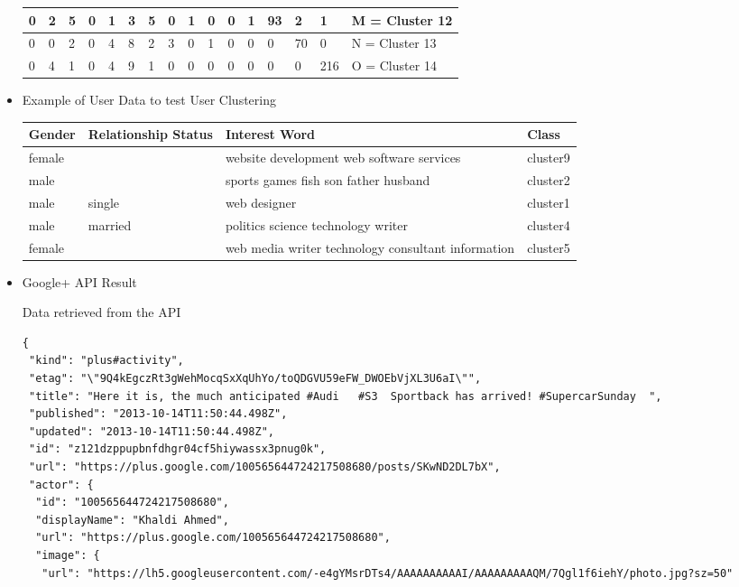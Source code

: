 \begin{itemize}
\begin{table}[H]
\begin{tabular}{|l|l|l|l|l|l|l|l|l|l|l|l|l|l|l|l|}
    0   & 2   & 5    & 0 & 1   & 3   & 5  & 0 & 1  & 0   & 0  & 1  & 93 & 2  & 1   & M = Cluster 12   \\ \hline
    0   & 0   & 2    & 0 & 4   & 8   & 2  & 3 & 0  & 1   & 0  & 0  & 0  & 70 & 0   & N = Cluster 13   \\ \hline
    0   & 4   & 1    & 0 & 4   & 9   & 1  & 0 & 0  & 0   & 0  & 0  & 0  & 0  & 216 & O = Cluster 14   \\ \hline
    \end{tabular}
\end{table}
\item Example of User Data to test User Clustering
\begin{table}[H]
    \begin{tabular}{|l|l|l|l|}
     \hline
    Gender & Relationship Status & Interest Word                                      & Class    \\  \hline
    female & ~                   & website development web  software services         & cluster9 \\  \hline
    male   & ~                   & sports games fish son father husband               & cluster2 \\  \hline
    male   & single              & web designer                                       & cluster1 \\  \hline
    male   & married             & politics science technology writer                 & cluster4 \\  \hline
    female & ~                   & web media writer technology consultant information & cluster5 \\  \hline
    \end{tabular}
\end{table}
\item Google+ API Result \\
{
Data retrieved from the API
\tiny
\begin{verbatim}
{
 "kind": "plus#activity",
 "etag": "\"9Q4kEgczRt3gWehMocqSxXqUhYo/toQDGVU59eFW_DWOEbVjXL3U6aI\"",
 "title": "Here it is, the much anticipated #Audi   #S3  Sportback has arrived! #SupercarSunday  ",
 "published": "2013-10-14T11:50:44.498Z",
 "updated": "2013-10-14T11:50:44.498Z",
 "id": "z121dzppupbnfdhgr04cf5hiywassx3pnug0k",
 "url": "https://plus.google.com/100565644724217508680/posts/SKwND2DL7bX",
 "actor": {
  "id": "100565644724217508680",
  "displayName": "Khaldi Ahmed",
  "url": "https://plus.google.com/100565644724217508680",
  "image": {
   "url": "https://lh5.googleusercontent.com/-e4gYMsrDTs4/AAAAAAAAAAI/AAAAAAAAAQM/7Qgl1f6iehY/photo.jpg?sz=50"

\end{verbatim}}
\end{itemize}
